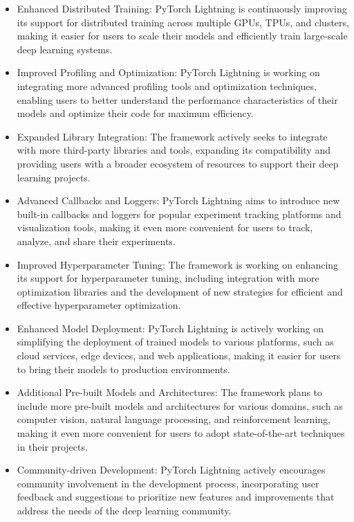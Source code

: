 \documentclass[12pt]{article}
\begin{document}
\begin{itemize}
    \item Enhanced Distributed Training: PyTorch Lightning is continuously improving its support for distributed training across multiple GPUs, TPUs, and clusters, making it easier for users to scale their models and efficiently train large-scale deep learning systems.
    \item Improved Profiling and Optimization: PyTorch Lightning is working on integrating more advanced profiling tools and optimization techniques, enabling users to better understand the performance characteristics of their models and optimize their code for maximum efficiency.
    \item Expanded Library Integration: The framework actively seeks to integrate with more third-party libraries and tools, expanding its compatibility and providing users with a broader ecosystem of resources to support their deep learning projects.
    \item Advanced Callbacks and Loggers: PyTorch Lightning aims to introduce new built-in callbacks and loggers for popular experiment tracking platforms and visualization tools, making it even more convenient for users to track, analyze, and share their experiments.
    \item Improved Hyperparameter Tuning: The framework is working on enhancing its support for hyperparameter tuning, including integration with more optimization libraries and the development of new strategies for efficient and effective hyperparameter optimization.
    \item Enhanced Model Deployment: PyTorch Lightning is actively working on simplifying the deployment of trained models to various platforms, such as cloud services, edge devices, and web applications, making it easier for users to bring their models to production environments.
    \item Additional Pre-built Models and Architectures: The framework plans to include more pre-built models and architectures for various domains, such as computer vision, natural language processing, and reinforcement learning, making it even more convenient for users to adopt state-of-the-art techniques in their projects.
    \item Community-driven Development: PyTorch Lightning actively encourages community involvement in the development process, incorporating user feedback and suggestions to prioritize new features and improvements that address the needs of the deep learning community.
\end{itemize}
\end{document}
